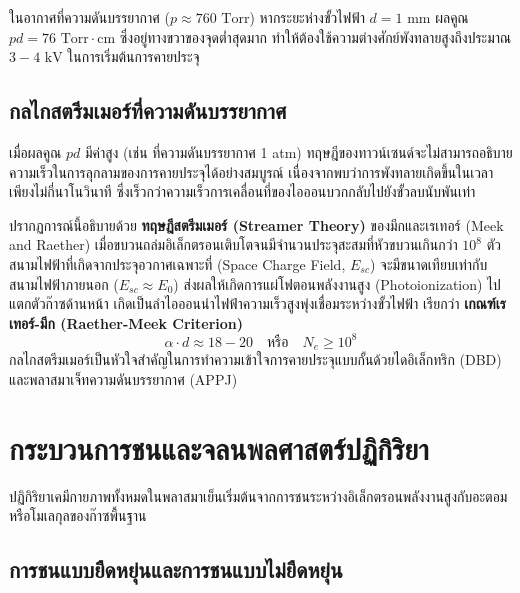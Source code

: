 ในอากาศที่ความดันบรรยากาศ ($p \approx 760\text{ Torr}$) หากระยะห่างขั้วไฟฟ้า $d = 1\text{ mm}$ ผลคูณ $pd = 76\text{ Torr}\cdot\text{cm}$ ซึ่งอยู่ทางขวาของจุดต่ำสุดมาก ทำให้ต้องใช้ความต่างศักย์พังทลายสูงถึงประมาณ $3 - 4\text{ kV}$ ในการเริ่มต้นการคายประจุ

\subsection{กลไกสตรีมเมอร์ที่ความดันบรรยากาศ}

เมื่อผลคูณ $pd$ มีค่าสูง (เช่น ที่ความดันบรรยากาศ 1 atm) ทฤษฎีของทาวน์เซนด์จะไม่สามารถอธิบายความเร็วในการลุกลามของการคายประจุได้อย่างสมบูรณ์ เนื่องจากพบว่าการพังทลายเกิดขึ้นในเวลาเพียงไม่กี่นาโนวินาที ซึ่งเร็วกว่าความเร็วการเคลื่อนที่ของไอออนบวกกลับไปยังขั้วลบนับพันเท่า

ปรากฏการณ์นี้อธิบายด้วย \textbf{ทฤษฎีสตรีมเมอร์ (Streamer Theory)} ของมีกและเรเทอร์ (Meek and Raether) เมื่อขบวนถล่มอิเล็กตรอนเติบโตจนมีจำนวนประจุสะสมที่หัวขบวนเกินกว่า $10^8$ ตัว สนามไฟฟ้าที่เกิดจากประจุอวกาศเฉพาะที่ (Space Charge Field, $E_{sc}$) จะมีขนาดเทียบเท่ากับสนามไฟฟ้าภายนอก ($E_{sc} \approx E_0$) ส่งผลให้เกิดการแผ่โฟตอนพลังงานสูง (Photoionization) ไปแตกตัวก๊าซด้านหน้า เกิดเป็นลำไอออนนำไฟฟ้าความเร็วสูงพุ่งเชื่อมระหว่างขั้วไฟฟ้า เรียกว่า \textbf{เกณฑ์เรเทอร์-มีก (Raether-Meek Criterion)}
\begin{equation}
    \alpha \cdot d \approx 18 - 20 \quad \text{หรือ} \quad N_e \ge 10^8
\end{equation}
กลไกสตรีมเมอร์เป็นหัวใจสำคัญในการทำความเข้าใจการคายประจุแบบกั้นด้วยไดอิเล็กทริก (DBD) และพลาสมาเจ็ทความดันบรรยากาศ (APPJ)

\section{กระบวนการชนและจลนพลศาสตร์ปฏิกิริยา}

ปฏิกิริยาเคมีกายภาพทั้งหมดในพลาสมาเย็นเริ่มต้นจากการชนระหว่างอิเล็กตรอนพลังงานสูงกับอะตอมหรือโมเลกุลของก๊าซพื้นฐาน

\subsection{การชนแบบยืดหยุ่นและการชนแบบไม่ยืดหยุ่น}

